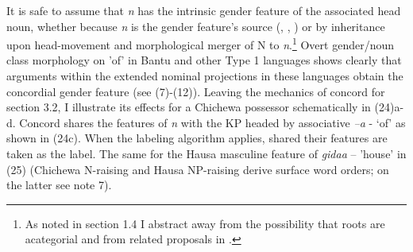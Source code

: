 \documentclass[output=paper
,modfonts
,nonflat]{langsci/langscibook}
\begin{document}
{It is safe to assume that \textit{n} has the intrinsic gender feature of the associated head noun, whether because \textit{n} is the gender feature's source (\citealt{Kramer2015}, \citealt{Kihm2005}, \citealt{Lecarme2002}) or by inheritance upon head-movement and morphological merger of N to \textit{n}.\footnote{As noted in section 1.4 I abstract away from the possibility that roots are acategorial and from related proposals in \citet{Chomsky2015}.} Overt gender/noun class morphology on 'of' in Bantu and other Type 1 languages shows clearly that arguments within the extended nominal projections in these languages obtain the concordial gender feature (see (7)-(12)). Leaving the mechanics of concord for section 3.2, I illustrate its effects for a Chichewa possessor schematically in (24)a-d. Concord shares the features of \textit{n} with the KP headed by associative \textit{–a} - ‘of’ as shown in (24c). When the labeling algorithm applies, shared their features are taken as the label. The same for the Hausa masculine feature of \textit{gidaa} – 'house' in (25) (Chichewa N-raising and Hausa NP-raising derive surface word orders; on the latter see note 7). 

}
\end{document}
